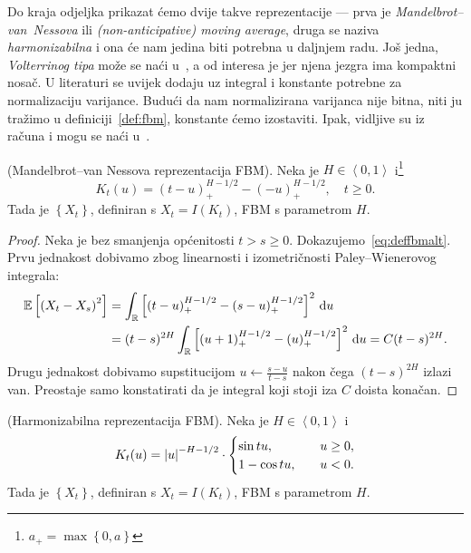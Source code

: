 \documentclass[main.tex]{subfiles}
\begin{document}
Do kraja odjeljka prikazat ćemo dvije takve reprezentacije ---
prva je \emph{Mandelbrot--van~Nessova} ili \emph{(non-anticipative) moving average},
druga se naziva \emph{harmonizabilna} i ona će nam jedina biti potrebna u daljnjem radu.
Još jedna, \emph{Volterrinog tipa} može se naći u~\cite{se}, a
od interesa je jer njena jezgra ima kompaktni nosač.
U literaturi se uvijek dodaju uz integral i konstante potrebne za normalizaciju varijance.
Budući da nam normalizirana varijanca nije bitna, niti ju tražimo
u definiciji~\ref{def:fbm}, konstante
ćemo izostaviti. Ipak, vidljive su iz računa i mogu se naći u~\cite{se}.

\begin{teorem} (Mandelbrot--van Nessova reprezentacija FBM).
	Neka je \( H \in \left\langle 0, 1 \right\rangle \) i\footnote{\( a_+=\max\left\{ 0,a \right\} \)}
	\begin{equation}\label{eq:kermvanness}
		K_t(u) =
		(t-u)_+^{H-1/2}
		- (-u)_+^{H-1/2}, \quad t \ge 0.
	\end{equation}
	Tada je \( \left\{ X_t \right\} \),
	definiran s \( X_t = I(K_t) \), FBM s parametrom \( H \).
\end{teorem}

\begin{proof}
	Neka je bez smanjenja općenitosti \( t > s \ge 0 \).
	Dokazujemo~\eqref{eq:deffbmalt}. Prvu jednakost
	dobivamo zbog linearnosti i izometričnosti Paley--Wienerovog integrala:
	\begin{align}
		\mathbb{E}\left[ \left( X_t-X_s \right)^2 \right]
		 & = \int_{\mathbb{R}} \left[ (t-u)_+^{H-1/2} - (s-u)_+^{H-1/2} \right]^2 \,\mathrm d u                          \\
		 & = (t-s)^{2H} \int_{\mathbb{R}} \left[ (u+1)_+^{H-1/2} - (u)_+^{H-1/2}  \right]^2 \,\mathrm d u = C(t-s)^{2H}.
	\end{align}
	Drugu jednakost dobivamo supstitucijom \( u \leftarrow \frac{s-u}{t-s} \)
	nakon čega \( (t-s)^{2H} \) izlazi van. Preostaje samo konstatirati da je
	integral koji stoji iza \( C \) doista konačan.
\end{proof}

\begin{teorem} (Harmonizabilna reprezentacija FBM).
	Neka je \( H \in \left\langle0,1\right\rangle \) i
	\begin{equation}
		K_t(u) =
		\left| {u} \right|^{-H-1/2} \cdot \begin{cases}
			\sin tu, \quad   & u \ge 0, \\
			1-\cos tu, \quad & u < 0.
		\end{cases}
	\end{equation}
	Tada je \( \left\{ X_t \right\} \),
	definiran s \( X_t = I(K_t) \), FBM s parametrom \( H \).
\end{teorem}
\end{document}
